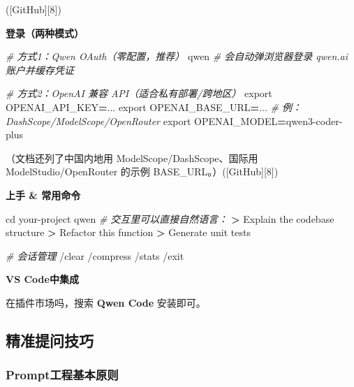 \documentclass[
]{book}
\newenvironment{Shaded}{\begin{snugshade}}{\end{snugshade}}
\newcommand{\BuiltInTok}[1]{#1}
\newcommand{\CommentTok}[1]{\textcolor[rgb]{0.56,0.35,0.01}{\textit{#1}}}
\newcommand{\ExtensionTok}[1]{#1}
\newcommand{\NormalTok}[1]{#1}
\newcommand{\OperatorTok}[1]{\textcolor[rgb]{0.81,0.36,0.00}{\textbf{#1}}}
\newcommand{\VariableTok}[1]{\textcolor[rgb]{0.00,0.00,0.00}{#1}}
\begin{document}
({[}GitHub{]}{[}8{]})

\textbf{登录（两种模式）}

\begin{Shaded}
\begin{Highlighting}[]
\CommentTok{\# 方式1：Qwen OAuth（零配置，推荐）}
\ExtensionTok{qwen}    \CommentTok{\# 会自动弹浏览器登录 qwen.ai 账户并缓存凭证}

\CommentTok{\# 方式2：OpenAI 兼容 API（适合私有部署/跨地区）}
\BuiltInTok{export} \VariableTok{OPENAI\_API\_KEY}\OperatorTok{=}\NormalTok{...}
\BuiltInTok{export} \VariableTok{OPENAI\_BASE\_URL}\OperatorTok{=}\NormalTok{...    }\CommentTok{\# 例：DashScope/ModelScope/OpenRouter}
\BuiltInTok{export} \VariableTok{OPENAI\_MODEL}\OperatorTok{=}\NormalTok{qwen3{-}coder{-}plus}
\end{Highlighting}
\end{Shaded}

（文档还列了中国内地用 ModelScope/DashScope、国际用 ModelStudio/OpenRouter 的示例 BASE\_URL。）({[}GitHub{]}{[}8{]})

\textbf{上手 \& 常用命令}

\begin{Shaded}
\begin{Highlighting}[]
\BuiltInTok{cd}\NormalTok{ your{-}project}
\ExtensionTok{qwen}
\CommentTok{\# 交互里可以直接自然语言：}
\OperatorTok{\textgreater{}}\NormalTok{ Explain }\ExtensionTok{the}\NormalTok{ codebase structure}
\OperatorTok{\textgreater{}}\NormalTok{ Refactor }\ExtensionTok{this}\NormalTok{ function}
\OperatorTok{\textgreater{}}\NormalTok{ Generate }\ExtensionTok{unit}\NormalTok{ tests}

\CommentTok{\# 会话管理}
\ExtensionTok{/clear}\NormalTok{   /compress   /stats   /exit}
\end{Highlighting}
\end{Shaded}

\textbf{VS Code中集成}

在插件市场吗，搜索 \textbf{Qwen Code} 安装即可。

\hypertarget{ux7cbeux51c6ux63d0ux95eeux6280ux5de7}{%
\subsection{精准提问技巧}\label{ux7cbeux51c6ux63d0ux95eeux6280ux5de7}}

\hypertarget{promptux5de5ux7a0bux57faux672cux539fux5219}{%
\subsubsection{Prompt工程基本原则}\label{promptux5de5ux7a0bux57faux672cux539fux5219}}
\end{document}
